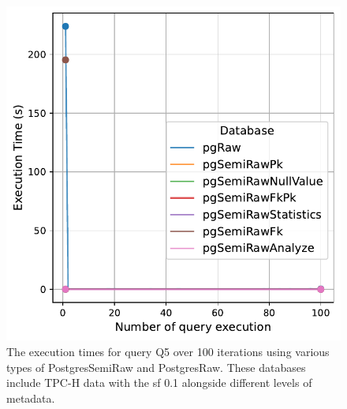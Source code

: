 \begin{figure}[hbt!]
\centering
\includegraphics[width=1.0\linewidth]{charts-eval-exp-time/execution_time_db_type_Q5.pdf}
\caption[Q5:result]{The execution times for query Q5 over 100 iterations using various types of PostgresSemiRaw and PostgresRaw. These databases include TPC-H data with the \acrshort{sf} 0.1 alongside different levels of metadata.}
\label{fig:execution_time_db_type_Q5}
\end{figure}
